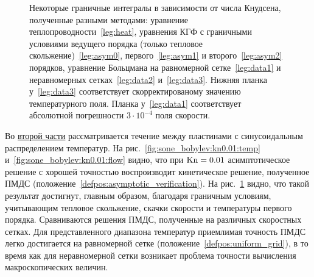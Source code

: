 \begin{figure}
    \centering
    \hypersetup{hidelinks} %
    \caption{
        Некоторые граничные интегралы в зависимости от числа Кнудсена, полученные разными методами:
        уравнение теплопроводности~\ref{leg:heat},
        уравнения КГФ с граничными условиями ведущего порядка (только тепловое скольжение)~\ref{leg:asym0},
        первого~\ref{leg:asym1} и второго~\ref{leg:asym2} порядков,
        уравнение Больцмана на равномерной сетке~\ref{leg:data1} и неравномерных сетках~\ref{leg:data2} и~\ref{leg:data3}.
        Нижняя планка у~\ref{leg:data3} соответствует скорректированому значению температурного поля.
        Планка у~\ref{leg:data1} соответствует абсолютной погрешности \(3\cdot10^{-4}\) поля скорости.
    }
    \label{fig:sone_bobylev:comparison}
\end{figure}

Во \underline{второй части} рассматривается течение между пластинами с синусоидальным распределением температур.
На рис.~\ref{fig:sone_bobylev:kn0.01:temp} и~\ref{fig:sone_bobylev:kn0.01:flow} видно,
что при \(\mathrm{Kn}=0.01\) асимптотическое решение с хорошей точностью воспроизводит кинетическое решение,
полученное ПМДС (положение~\ref{defpos:asymptotic_verification}).
На рис.~\ref{fig:sone_bobylev:comparison} видно, что такой результат достигнут, главным образом,
благодаря граничным условиям, учитывающим тепловое скольжение, скачки скорости и температуры первого порядка.
Сравниваются решения ПМДС, полученные на различных скоростных сетках.
Для представленного диапазона температур приемлимая точность ПМДС легко достигается
на равномерной сетке (положение~\ref{defpos:uniform_grid}), в то время как для неравномерной сетки
возникает проблема точности вычисления макроскопических величин.

